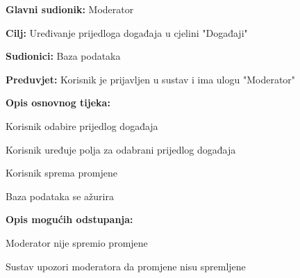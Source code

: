 						\noindent {}
					\begin{packed_item}
	
						\item \textbf{Glavni sudionik: }Moderator
						\item  \textbf{Cilj:} Uređivanje prijedloga događaja u cjelini "Događaji"
						\item  \textbf{Sudionici:} Baza podataka
						\item  \textbf{Preduvjet:} Korisnik je prijavljen u sustav i ima ulogu "Moderator"
						\item  \textbf{Opis osnovnog tijeka:}
						
						\item[] \begin{packed_enum}
	
							\item Korisnik odabire prijedlog događaja 
							\item Korisnik uređuje polja za odabrani prijedlog događaja
							\item Korisnik sprema promjene
							\item Baza podataka se ažurira
							
						\end{packed_enum}
						\item  \textbf{Opis mogućih odstupanja:}
						
						\item[] \begin{packed_item}
	
							\item[3.a] Moderator nije spremio promjene
							\item[] \begin{packed_enum}
								
								\item Sustav upozori moderatora da promjene nisu spremljene
								
							\end{packed_enum}
							
							
						\end{packed_item}
						\end{packed_item}
					\noindent {}

